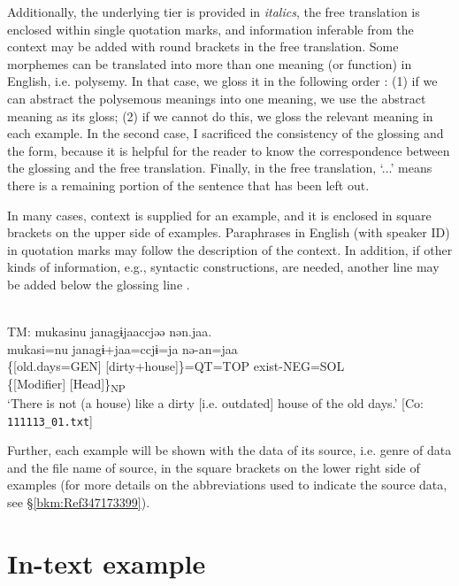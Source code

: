 Additionally, the underlying tier is provided in \textit{italics}, the free translation is enclosed within single quotation marks, and information inferable from the context may be added with round brackets in the free translation. Some morphemes can be translated into more than one meaning (or function) in English, i.e. polysemy. In that case, we gloss it in the following order \citep[cf.][11--12]{Lehmann2004}: (1) if we can abstract the polysemous meanings into one meaning, we use the abstract meaning as its gloss; (2) if we cannot do this, we gloss the relevant meaning in each example. In the second case, I sacrificed the consistency of the glossing and the form, because it is helpful for the reader to know the correspondence between the glossing and the free translation. Finally, in the free translation, ‘...’ means there is a remaining portion of the sentence that has been left out.

In many cases, context is supplied for an example, and it is enclosed in square brackets on the upper side of examples. Paraphrases in English (with speaker ID) in quotation marks may follow the description of the context. In addition, if other kinds of information, e.g., syntactic constructions, are needed, another line may be added below the glossing line \citep[cf.][4--5]{Lehmann2004}.

\ea{}\\
TM: \gllll mukasinu janagɨjaaccjəə nən.jaa.\\
          mukasi=nu janagɨ+jaa=ccjɨ=ja nə-an=jaa\\
          \{[old.days=GEN] [dirty+house]\}=QT=TOP exist-NEG=SOL\\
          \{[Modifier] [Head]\}\textsubscript{NP}\\
   \glt{} ‘There is not (a house) like a dirty [i.e. outdated] house of the old days.’ [Co: \texttt{111113\_01.txt}]

\z

Further, each example will be shown with the data of its source, i.e. genre of data and the file name of source, in the square brackets on the lower right side of examples (for more details on the abbreviations used to indicate the source data, see §\ref{bkm:Ref347173399}).

\section*{In-text example}

